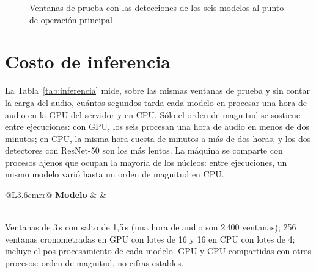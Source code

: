 \documentclass[12pt,a4paper]{article}
\begin{document}
\begin{figure}[htbp]
    \centering
    
    \caption{Ventanas de prueba con las detecciones de los seis modelos al punto de
        operación principal}
    \label{fig:ventanas}
\end{figure}

\section{Costo de inferencia}

La Tabla~\ref{tab:inferencia} mide, sobre las mismas ventanas de prueba y sin contar la
carga del audio, cuántos segundos tarda cada modelo en procesar una hora de audio en la GPU
del servidor y en CPU. Sólo el orden de magnitud se sostiene entre ejecuciones: con GPU, los
seis procesan una hora de audio en menos de dos minutos; en CPU, la misma hora cuesta de
minutos a más de dos horas, y los dos detectores con ResNet-50 son los más lentos. La máquina
se comparte con procesos ajenos que ocupan la mayoría de los núcleos: entre ejecuciones, un
mismo modelo varió hasta un orden de magnitud en CPU. 

\begin{table}[htbp]
    \centering
    \begin{threeparttable}
        \caption{Segundos de cómputo por hora de audio}
        \label{tab:inferencia}
        \small
        \begin{tabular}{@{}L{3.6cm}rr@{}}
            \toprule
            \textbf{Modelo} &  &  \\
            \midrule
             \\
            \bottomrule
        \end{tabular}
        \begin{tablenotes}[flushleft]
            \footnotesize
            \item Ventanas de 3\,s con salto de 1,5\,s (una hora de audio son 2\,400
            ventanas); 256 ventanas cronometradas en GPU con lotes de 16 y 16 en CPU con
            lotes de 4; incluye el pos-procesamiento de cada modelo. GPU y CPU compartidas con
            otros procesos: orden de magnitud, no cifras estables.
        \end{tablenotes}
    \end{threeparttable}
\end{table}
\end{document}

